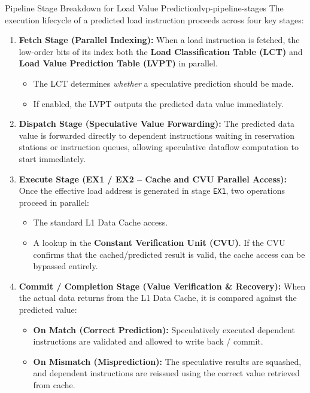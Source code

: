 \begin{definition}{Pipeline Stage Breakdown for Load Value Prediction}{lvp-pipeline-stages}
The execution lifecycle of a predicted load instruction proceeds across four key stages:
\begin{enumerate}
    \item \textbf{Fetch Stage (Parallel Indexing):} 
    When a load instruction is fetched, the low-order bits of its  index both the \textbf{Load Classification Table (LCT)} and \textbf{Load Value Prediction Table (LVPT)} in parallel.
    \begin{itemize}
        \item The LCT determines \textit{whether} a speculative prediction should be made.
        \item If enabled, the LVPT outputs the predicted data value immediately.
    \end{itemize}
    \item \textbf{Dispatch Stage (Speculative Value Forwarding):} 
    The predicted data value is forwarded directly to dependent instructions waiting in reservation stations or instruction queues, allowing speculative dataflow computation to start immediately.
    \item \textbf{Execute Stage (EX1 / EX2 -- Cache and CVU Parallel Access):}
    Once the effective load address is generated in stage \texttt{EX1}, two operations proceed in parallel:
    \begin{itemize}
        \item The standard L1 Data Cache access.
        \item A lookup in the \textbf{Constant Verification Unit (CVU)}. If the CVU confirms that the cached/predicted result is valid, the cache access can be bypassed entirely.
    \end{itemize}
    \item \textbf{Commit / Completion Stage (Value Verification \& Recovery):}
    When the actual data returns from the L1 Data Cache, it is compared against the predicted value:
    \begin{itemize}
        \item \textbf{On Match (Correct Prediction):} Speculatively executed dependent instructions are validated and allowed to write back / commit.
        \item \textbf{On Mismatch (Misprediction):} The speculative results are squashed, and dependent instructions are reissued using the correct value retrieved from cache.
    \end{itemize}
\end{enumerate}
\end{definition}

